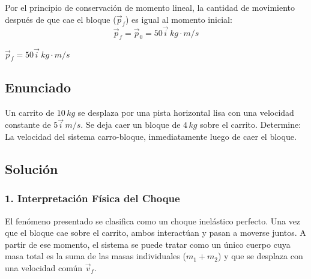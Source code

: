 \documentclass[12pt, a4paper]{article}
\begin{document}
Por el principio de conservación de momento lineal, la cantidad de movimiento después de que cae el bloque ($\vec{p}_f$) es igual al momento inicial:
\[ \vec{p}_f = \vec{p}_0 = 50 \vec{i} \, \si{kg\cdot m/s} \]

\begin{tcolorbox}[colback=green!5!white, colframe=green!50!black, title=Respuesta Final]
\centering \Large $\vec{p}_f = 50 \vec{i} \, \si{kg\cdot m/s}$
\end{tcolorbox}

\newpage

\subsection*{Enunciado}
Un carrito de $10 \, \si{kg}$ se desplaza por una pista horizontal lisa con una velocidad constante de $5 \vec{i} \, \si{m/s}$. Se deja caer un bloque de $4 \, \si{kg}$ sobre el carrito. Determine: La velocidad del sistema carro-bloque, inmediatamente luego de caer el bloque.

\begin{center}
\end{center}

\subsection*{Solución}

\subsubsection*{1. Interpretación Física del Choque}
El fenómeno presentado se clasifica como un choque inelástico perfecto. Una vez que el bloque cae sobre el carrito, ambos interactúan y pasan a moverse juntos. A partir de ese momento, el sistema se puede tratar como un único cuerpo cuya masa total es la suma de las masas individuales ($m_1 + m_2$) y que se desplaza con una velocidad común $\vec{v}_f$.
\end{document}
